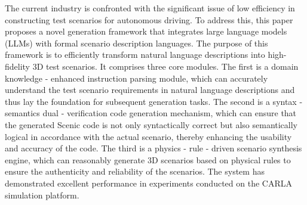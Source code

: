 \begin{abstracten}
	
	The current industry is confronted with the significant issue of low efficiency in constructing test scenarios for autonomous driving. To address this, this paper proposes a novel generation framework that integrates large language models (LLMs) with formal scenario description languages. The purpose of this framework is to efficiently transform natural language descriptions into high-fidelity 3D test scenarios. It comprises three core modules. The first is a domain knowledge - enhanced instruction parsing module, which can accurately understand the test scenario requirements in natural language descriptions and thus lay the foundation for subsequent generation tasks. The second is a syntax - semantics dual - verification code generation mechanism, which can ensure that the generated Scenic code is not only syntactically correct but also semantically logical in accordance with the actual scenario, thereby enhancing the usability and accuracy of the code. The third is a physics - rule - driven scenario synthesis engine, which can reasonably generate 3D scenarios based on physical rules to ensure the authenticity and reliability of the scenarios. The system has demonstrated excellent performance in experiments conducted on the CARLA simulation platform.
	
\end{abstracten}